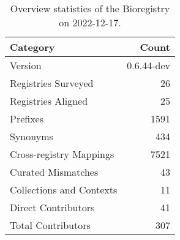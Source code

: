 \begin{table}
\centering
\caption{Overview statistics of the Bioregistry on 2022-12-17.}
\label{tab:bioregistry-summary}
\begin{tabular}{lr}
\toprule
                Category &      Count \\
\midrule
                 Version & 0.6.44-dev \\
     Registries Surveyed &         26 \\
      Registries Aligned &         25 \\
                Prefixes &       1591 \\
                Synonyms &        434 \\
 Cross-registry Mappings &       7521 \\
      Curated Mismatches &         43 \\
Collections and Contexts &         11 \\
     Direct Contributors &         41 \\
      Total Contributors &        307 \\
\bottomrule
\end{tabular}
\end{table}
